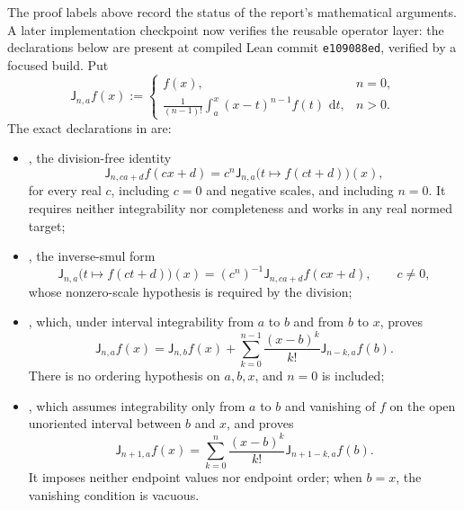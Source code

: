 \documentclass[11pt,oneside]{article}
\theoremstyle{definition}
\theoremstyle{remark}
\newcommand{\dd}{\,\mathrm d}
\newcommand{\1}{\mathbf 1}
\begin{document}
The proof labels above record the status of the report's mathematical arguments.  A later
implementation checkpoint now verifies the reusable operator layer: the declarations below
are present at compiled Lean commit \texttt{e109088ed}, verified by a focused build.  Put
\begin{equation}
 \mathsf J_{n,a}f(x):=
 \begin{cases}
 f(x),&n=0,\\[1mm]
 \displaystyle\frac1{(n-1)!}\int_a^x(x-t)^{n-1}f(t)\,\dd t,&n>0.
 \end{cases}                                                \label{p6:eq:lean-volterra-current}
\end{equation}
The exact declarations in  are:
\begin{itemize}
\item {}, the division-free identity
\begin{equation}
 \mathsf J_{n,ca+d}f(cx+d)
 =c^n\mathsf J_{n,a}\bigl(t\mapsto f(ct+d)\bigr)(x),          \label{p6:eq:lean-affine-current}
\end{equation}
for every real \(c\), including \(c=0\) and negative scales, and including \(n=0\).  It
requires neither integrability nor completeness and works in any real normed target;
\item {}, the inverse-smul form
\begin{equation}
 \mathsf J_{n,a}\bigl(t\mapsto f(ct+d)\bigr)(x)
 =(c^n)^{-1}\mathsf J_{n,ca+d}f(cx+d),\qquad c\ne0,           \label{p6:eq:lean-comp-affine-current}
\end{equation}
whose nonzero-scale hypothesis is required by the division;
\item {}, which, under interval integrability from
\(a\) to \(b\) and from \(b\) to \(x\), proves
\begin{equation}
 \mathsf J_{n,a}f(x)=\mathsf J_{n,b}f(x)
 +\sum_{k=0}^{n-1}\frac{(x-b)^k}{k!}\mathsf J_{n-k,a}f(b).    \label{p6:eq:lean-basepoint-current}
\end{equation}
There is no ordering hypothesis on \(a,b,x\), and \(n=0\) is included;
\item {}, which assumes integrability only
from \(a\) to \(b\) and vanishing of \(f\) on the open unoriented interval between \(b\) and
\(x\), and proves
\begin{equation}
 \mathsf J_{n+1,a}f(x)
 =\sum_{k=0}^{n}\frac{(x-b)^k}{k!}\mathsf J_{n+1-k,a}f(b).    \label{p6:eq:lean-zero-tail-current}
\end{equation}
It imposes neither endpoint values nor endpoint order; when \(b=x\), the vanishing condition
is vacuous.
\end{itemize}
\end{document}

